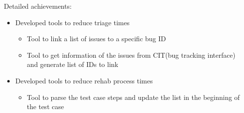 \documentclass[]{friggeri-cv}
\begin{document}
\begin{entrylist}
{Detailed achievements:
\begin{itemize}
\item Developed tools to reduce triage times
\begin{itemize}
\item Tool to link a list of issues to a specific bug ID
\item Tool to get information of the issues from CIT(bug tracking interface) and generate list of IDs to link
\end{itemize}
\item Developed tools to reduce rehab process times
\begin{itemize}
\item Tool to parse the test case steps and update the list in the beginning of the test case 
\end{itemize}
\end{itemize}
}
\end{entrylist}
\end{document}
